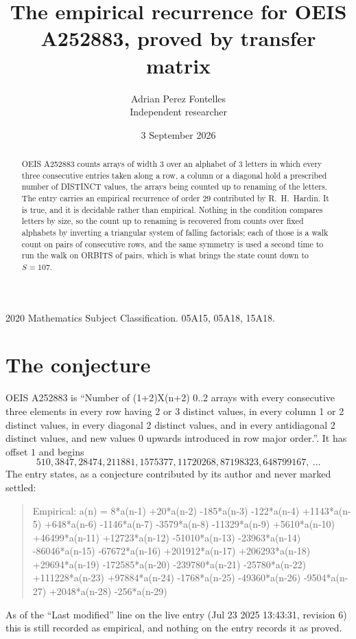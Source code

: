 \documentclass[11pt,a4paper]{article}
\title{The empirical recurrence for OEIS A252883, proved by transfer matrix}
\author{Adrian Perez Fontelles\\ \small Independent researcher}
\date{3 September 2026}
\theoremstyle{plain}
\theoremstyle{definition}
\begin{document}
\maketitle

\begin{abstract}
OEIS A252883 counts arrays of width $3$ over an alphabet of $3$ letters in which every three
consecutive entries taken along a row, a column or a diagonal hold a prescribed number of
DISTINCT values, the arrays being counted up to renaming of the letters. The entry carries an
empirical recurrence of order $29$ contributed by R.~H.~Hardin. It is true, and it is
decidable rather than empirical. Nothing in the condition compares letters by size, so the
count up to renaming is recovered from counts over fixed alphabets by inverting a triangular
system of falling factorials; each of those is a walk count on pairs of consecutive rows, and
the same symmetry is used a second time to run the walk on ORBITS of pairs, which is what
brings the state count down to $S=107$.
\end{abstract}

\noindent\small 2020 Mathematics Subject Classification. 05A15, 05A18, 15A18.\normalsize

\section{The conjecture}

OEIS A252883 is ``Number of (1+2)X(n+2) 0..2 arrays with every consecutive three elements in every row having 2 or 3 distinct values, in every column 1 or 2 distinct values, in every diagonal 2 distinct values, and in every antidiagonal 2 distinct values, and new values 0 upwards introduced in row major order.''. It has offset $1$ and begins
\[
510, 3847, 28474, 211881, 1575377, 11720268, 87198323, 648799167,\ \dots
\]
The entry states, as a conjecture contributed by its author and never marked settled:
\begin{quote}
Empirical: a(n) = 8*a(n-1) +20*a(n-2) -185*a(n-3) -122*a(n-4) +1143*a(n-5) +648*a(n-6) -1146*a(n-7) -3579*a(n-8) -11329*a(n-9) +5610*a(n-10) +46499*a(n-11) +12723*a(n-12) -51010*a(n-13) -23963*a(n-14) -86046*a(n-15) -67672*a(n-16) +201912*a(n-17) +206293*a(n-18) +29694*a(n-19) -172585*a(n-20) -239780*a(n-21) -25780*a(n-22) +111228*a(n-23) +97884*a(n-24) -1768*a(n-25) -49360*a(n-26) -9504*a(n-27) +2048*a(n-28) -256*a(n-29)
\end{quote}
As of the ``Last modified'' line on the live entry (Jul 23 2025 13:43:31, revision 6) this is still
recorded as empirical, and nothing on the entry records it as proved.
\end{document}
